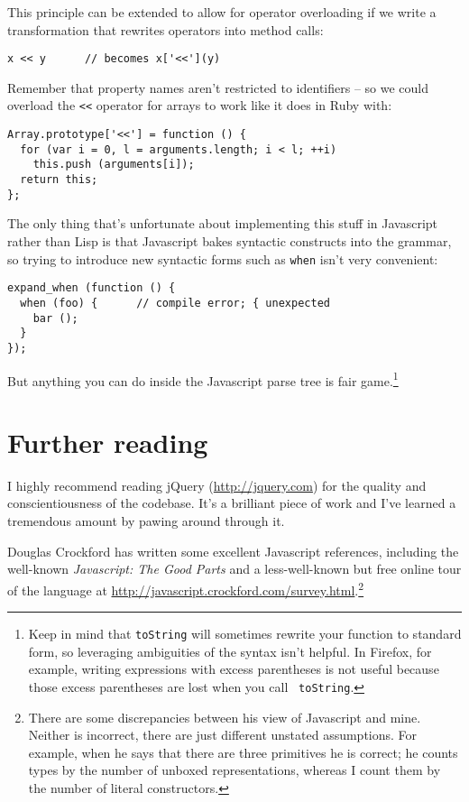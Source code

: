 \documentclass{article}
\begin{document}
    This principle can be extended to allow for operator overloading if we write a transformation that rewrites operators into method calls:

\begin{verbatim}
x << y      // becomes x['<<'](y)
\end{verbatim}

    Remember that property names aren't restricted to identifiers -- so we could overload the \verb|<<| operator for arrays to work like it does in Ruby with:

\begin{verbatim}
Array.prototype['<<'] = function () {
  for (var i = 0, l = arguments.length; i < l; ++i)
    this.push (arguments[i]);
  return this;
};
\end{verbatim}

    The only thing that's unfortunate about implementing this stuff in Javascript rather than Lisp is that Javascript bakes syntactic constructs into the grammar, so trying to introduce new
    syntactic forms such as \verb|when| isn't very convenient:
    
\begin{verbatim}
expand_when (function () {
  when (foo) {      // compile error; { unexpected
    bar ();
  }
});
\end{verbatim}

    But anything you can do inside the Javascript parse tree is fair game.\footnote{Keep in mind that {\tt toString} will sometimes rewrite your function to standard form, so leveraging
    ambiguities of the syntax isn't helpful. In Firefox, for example, writing expressions with excess parentheses is not useful because those excess parentheses are lost when you call {\tt
    toString}.}

\section {Further reading}
  I highly recommend reading jQuery (\url{http://jquery.com}) for the quality and conscientiousness of the codebase. It's a brilliant piece of work and I've learned a tremendous amount by
  pawing around through it.

  Douglas Crockford has written some excellent Javascript references, including the well-known {\it Javascript: The Good Parts} and a less-well-known but free online tour of the language at
  \url{http://javascript.crockford.com/survey.html}.\footnote{There are some discrepancies between his view of Javascript and mine. Neither is incorrect, there are just different unstated
  assumptions. For example, when he says that there are three primitives he is correct; he counts types by the number of unboxed representations, whereas I count them by the number of literal
  constructors.}
\end{document}
